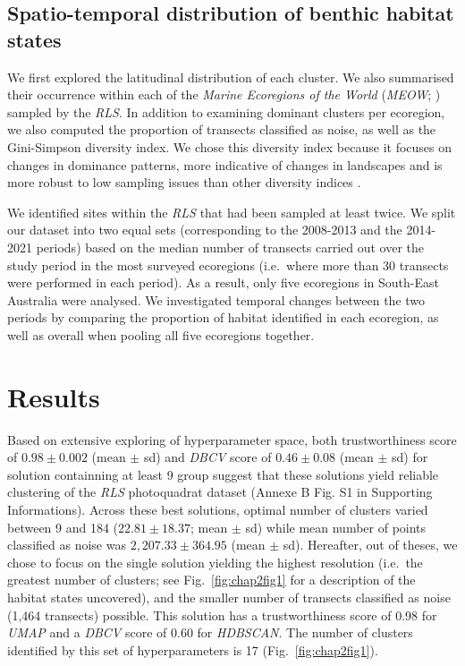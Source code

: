 \begin{refsection}
\hypertarget{spatio-temporal-distribution-of-benthic-habitat-states}{%
\subsection{Spatio-temporal distribution of benthic habitat
states}\label{spatio-temporal-distribution-of-benthic-habitat-states}}

We first explored the latitudinal distribution of each cluster. We also
summarised their occurrence within each of the \emph{Marine Ecoregions
of the World} (\emph{MEOW}; \textcite{Spalding_2007}) sampled by the
\emph{RLS}. In addition to examining dominant clusters per ecoregion, we
also computed the proportion of transects classified as noise, as well
as the Gini-Simpson diversity index. We chose this diversity index
because it focuses on changes in dominance patterns, more indicative of
changes in landscapes and is more robust to low sampling issues than
other diversity indices \autocite{Lande_2000}.

We identified sites within the \emph{RLS} that had been sampled at least
twice. We split our dataset into two equal sets (corresponding to the
2008-2013 and the 2014-2021 periods) based on the median number of
transects carried out over the study period in the most surveyed
ecoregions (i.e.~where more than 30 transects were performed in each
period). As a result, only five ecoregions in South-East Australia were
analysed. We investigated temporal changes between the two periods by
comparing the proportion of habitat identified in each ecoregion, as
well as overall when pooling all five ecoregions together.

\clearpage

\hypertarget{results-chapt2}{%
\section{Results}\label{results-chapt2}}

Based on extensive exploring of hyperparameter space, both
trustworthiness score of \(0.98 \pm 0.002\) (mean \(\pm\) sd) and
\emph{DBCV} score of \(0.46 \pm 0.08\) (mean \(\pm\) sd) for solution
containning at least 9 group suggest that these solutions yield reliable
clustering of the \emph{RLS} photoquadrat dataset (Annexe B Fig. S1 in
Supporting Informations). Across these best solutions, optimal number of
clusters varied between 9 and 184 (\(22.81 \pm 18.37\); mean \(\pm\) sd)
while mean number of points classified as noise was
\(2,207.33 \pm 364.95\) (mean \(\pm\) sd). Hereafter, out of theses, we
chose to focus on the single solution yielding the highest resolution
(i.e.~the greatest number of clusters; see Fig.~\ref{fig:chap2fig1} for
a description of the habitat states uncovered), and the smaller number
of transects classified as noise (1,464 transects) possible. This
solution has a trustworthiness score of 0.98 for \emph{UMAP} and a
\emph{DBCV} score of 0.60 for \emph{HDBSCAN}. The number of clusters
identified by this set of hyperparameters is 17
(Fig.~\ref{fig:chap2fig1}).


\end{refsection}
